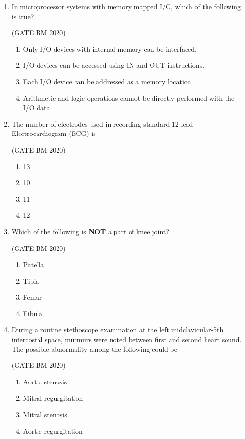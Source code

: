 \documentclass[journal]{IEEEtran}
\begin{document}
\begin{enumerate}
\item In microprocessor systems with memory mapped I/O, which of the following is true?



	\hfill(GATE BM 2020)
\begin{enumerate}
    \item Only I/O devices with internal memory can be interfaced.
    \item I/O devices can be accessed using IN and OUT instructions.
    \item Each I/O device can be addressed as a memory location.
    \item Arithmetic and logic operations cannot be directly performed with the I/O data.
\end{enumerate}

\item The number of electrodes used in recording standard 12-lead Electrocardiogram (ECG) is


	\hfill(GATE BM 2020)
\begin{multicols}{4}
\begin{enumerate}
    \item 13
    \item 10
    \item 11
    \item 12
\end{enumerate}
\end{multicols}

\item Which of the following is \textbf{NOT} a part of knee joint?


	\hfill(GATE BM 2020)
\begin{multicols}{4}
\begin{enumerate}
    \item Patella
    \item Tibia
    \item Femur
    \item Fibula
\end{enumerate}
\end{multicols}

\item During a routine stethoscope examination at the left midclavicular-5th intercostal space, murmurs were noted between first and second heart sound. The possible abnormality among the following could be


	\hfill(GATE BM 2020)

\begin{enumerate}
    \item Aortic stenosis
    \item Mitral regurgitation
    \item Mitral stenosis
    \item Aortic regurgitation
\end{enumerate}



\end{enumerate}
\end{document}
